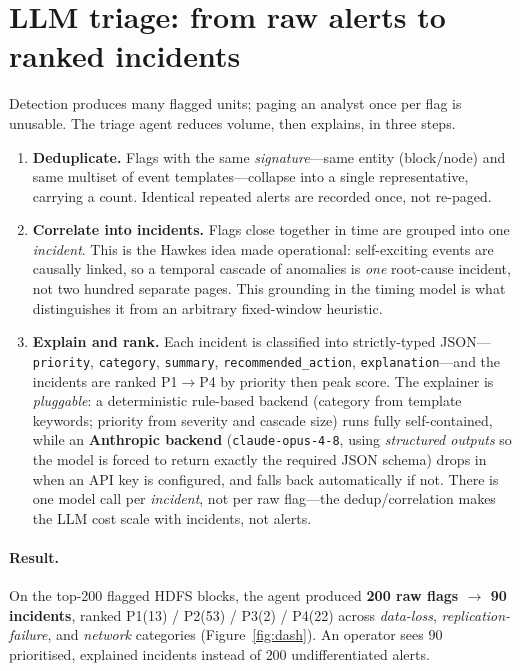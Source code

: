 \documentclass[11pt,a4paper]{article}
\newcommand{\keyword}[1]{\textbf{\color{accent}#1}}
\newcommand{\code}[1]{\texttt{\small #1}}
\begin{document}
\section{LLM triage: from raw alerts to ranked incidents}
\label{sec:triage}

Detection produces many flagged units; paging an analyst once per flag is
unusable. The triage agent reduces volume, then explains, in three steps.

\begin{enumerate}[leftmargin=1.6em]
  \item \keyword{Deduplicate.} Flags with the same \emph{signature}---same entity
  (block/node) and same multiset of event templates---collapse into a single
  representative, carrying a count. Identical repeated alerts are recorded once,
  not re-paged.
  \item \keyword{Correlate into incidents.} Flags close together in time are
  grouped into one \emph{incident}. This is the Hawkes idea made
  operational: self-exciting events are causally linked, so a temporal cascade of
  anomalies is \emph{one} root-cause incident, not two hundred separate pages.
  This grounding in the timing model is what distinguishes it from an arbitrary
  fixed-window heuristic.
  \item \keyword{Explain and rank.} Each incident is classified into
  strictly-typed JSON---\code{priority}, \code{category}, \code{summary},
  \code{recommended\_action}, \code{explanation}---and the incidents are ranked
  P1$\to$P4 by priority then peak score. The explainer is \emph{pluggable}: a
  deterministic rule-based backend (category from template keywords; priority from
  severity and cascade size) runs fully self-contained, while an \keyword{Anthropic
  backend} (\code{claude-opus-4-8}, using \emph{structured outputs} so the model
  is forced to return exactly the required JSON schema) drops in when an API key is
  configured, and falls back automatically if not. There is one model call per
  \emph{incident}, not per raw flag---the dedup/correlation makes the LLM cost
  scale with incidents, not alerts.
\end{enumerate}

\paragraph{Result.} On the top-200 flagged HDFS blocks, the agent produced
\textbf{200 raw flags $\to$ 90 incidents}, ranked P1(13) / P2(53) / P3(2) /
P4(22) across \emph{data-loss}, \emph{replication-failure}, and \emph{network}
categories (Figure~\ref{fig:dash}). An operator sees $90$ prioritised, explained
incidents instead of $200$ undifferentiated alerts.
\end{document}
